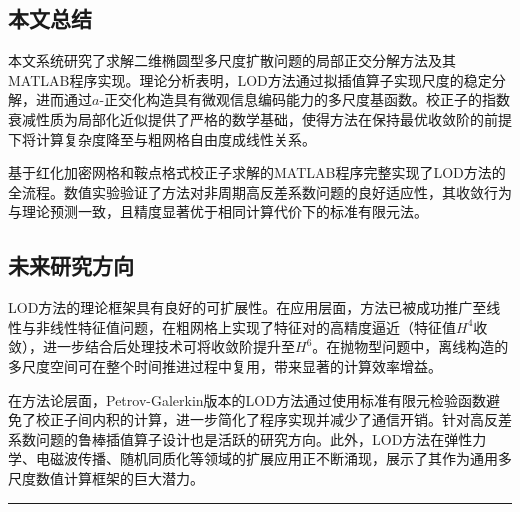 \documentclass[
]{article}
\begin{document}
\subsection{本文总结}\label{chap-7-1}

本文系统研究了求解二维椭圆型多尺度扩散问题的局部正交分解方法及其MATLAB程序实现。理论分析表明，LOD方法通过拟插值算子实现尺度的稳定分解，进而通过\(a\)-正交化构造具有微观信息编码能力的多尺度基函数。校正子的指数衰减性质为局部化近似提供了严格的数学基础，使得方法在保持最优收敛阶的前提下将计算复杂度降至与粗网格自由度成线性关系\autocite{malqvist2014localization,malqvist2021numerical}。

基于红化加密网格和鞍点格式校正子求解的MATLAB程序完整实现了LOD方法的全流程。数值实验验证了方法对非周期高反差系数问题的良好适应性，其收敛行为与理论预测一致，且精度显著优于相同计算代价下的标准有限元法\autocite{engwer2019efficient}。

\subsection{未来研究方向}\label{chap-7-2}

LOD方法的理论框架具有良好的可扩展性。在应用层面，方法已被成功推广至线性与非线性特征值问题，在粗网格上实现了特征对的高精度逼近（特征值\(H^4\)收敛），进一步结合后处理技术可将收敛阶提升至\(H^6\)。在抛物型问题中，离线构造的多尺度空间可在整个时间推进过程中复用，带来显著的计算效率增益。

在方法论层面，Petrov-Galerkin版本的LOD方法通过使用标准有限元检验函数避免了校正子间内积的计算，进一步简化了程序实现并减少了通信开销。针对高反差系数问题的鲁棒插值算子设计也是活跃的研究方向\autocite{kornhuber2016numerical}。此外，LOD方法在弹性力学、电磁波传播、随机同质化等领域的扩展应用正不断涌现，展示了其作为通用多尺度数值计算框架的巨大潜力\autocite{gallistl2017quasilocal}。

\begin{center}\rule{0.5\linewidth}{0.5pt}\end{center}

\printbibliography
\end{document}
